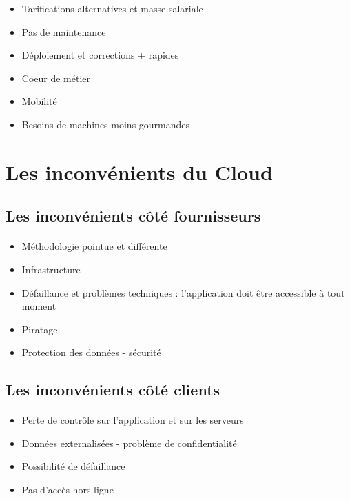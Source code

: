 \documentclass[a4paper,12pt]{report}
\begin{document}
\begin{onehalfspace}
	\begin{itemize}
		\item Tarifications alternatives et masse salariale
		\item Pas de maintenance
		\item Déploiement et corrections + rapides
		\item Coeur de métier
		\item Mobilité
		\item Besoins de machines moins gourmandes
	\end{itemize}
	
	\section{Les inconvénients du Cloud}
	
	\subsection{Les inconvénients côté fournisseurs}

	\paragraph*{}
	\begin{itemize}
		\item Méthodologie pointue et différente
		\item Infrastructure
		\item Défaillance et problèmes techniques : l’application doit être accessible à tout moment
		\item Piratage
		\item Protection des données - sécurité
	\end{itemize}
	
	\subsection{Les inconvénients côté clients}
	

	\paragraph*{}
	\begin{itemize}
		\item Perte de contrôle sur l’application et sur les serveurs
		\item Données externalisées - problème de confidentialité
		\item Possibilité de défaillance
		\item Pas d’accès hors-ligne
	\end{itemize}
	

\end{onehalfspace}
\end{document}

